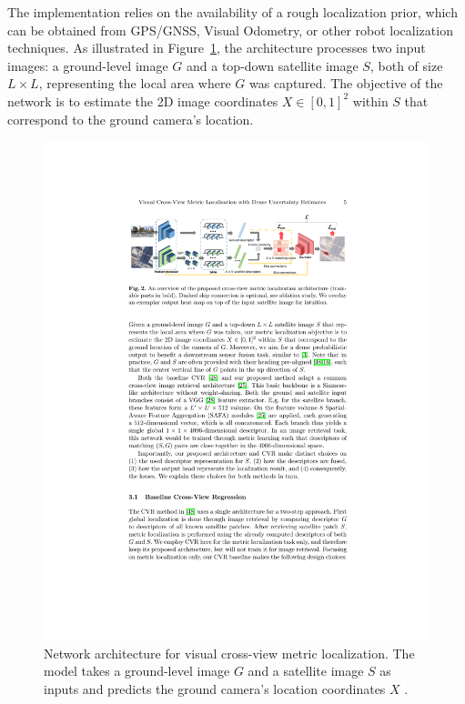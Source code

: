 The implementation relies on the availability of a rough localization prior, which can be obtained from GPS/GNSS, Visual Odometry, or other robot localization techniques. As illustrated in Figure~\ref{fig:visual_cross_metric_architecture}, the architecture processes two input images: a ground-level image \( G \) and a top-down satellite image \( S \), both of size \( L \times L \), representing the local area where \( G \) was captured. The objective of the network is to estimate the 2D image coordinates \( X \in [0, 1]^2 \) within \( S \) that correspond to the ground camera's location. 
\begin{figure}[H]
    \centering
    \includegraphics[width=1\linewidth]{LateX//figs/2208.08519v1.pdf}
    \caption{Network architecture for visual cross-view metric localization. The model takes a ground-level image \( G \) and a satellite image \( S \) as inputs and predicts the ground camera's location coordinates \( X \) \cite{xia2022visualcrossviewmetriclocalization}.}
    \label{fig:visual_cross_metric_architecture}
\end{figure}

